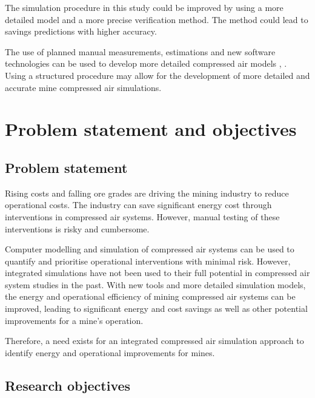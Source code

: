 		\par 
		 The simulation procedure in this study could be improved by using a more detailed model and a more precise verification method. The method could lead to savings predictions with higher accuracy. 
		\par
		The use of planned manual measurements, estimations and new software technologies can be used to develop more detailed compressed air models \cite{Bredenkamp2015Challeges}, \cite{Mare2017Evaluating}. Using a structured procedure may allow for the development of more detailed and accurate mine compressed air simulations.
		

\section{Problem statement and objectives}
	\subsection{Problem statement}
 		Rising costs and falling ore grades are driving the mining industry to reduce operational costs. The industry can save significant energy cost through interventions in compressed air systems. However, manual testing of these interventions is risky and cumbersome.
 		\par
 		Computer modelling and simulation of compressed air systems can be used to quantify and prioritise operational interventions with minimal risk. However, integrated simulations have not been used to their full potential in compressed air system studies in the past. With new tools and more detailed simulation models, the energy and operational efficiency of mining compressed air systems can be improved, leading to significant energy and cost savings as well as other potential improvements for a mine's operation.
 		\par 
 		Therefore, a need exists for an integrated compressed air simulation approach to identify energy and operational improvements for mines.
 			\subsection{Research objectives}
 			
 			
